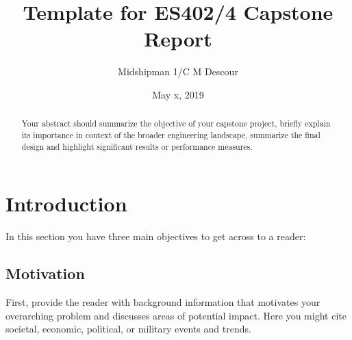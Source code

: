 \documentclass{wsecapstone}
\title{Template for ES402/4 Capstone Report}
\author{Midshipman 1/C M Descour}
\date{May x, 2019} %
\begin{document}
\maketitlepage
\cleardoublepage
\tableofcontents

\clearpage
\maketitle
\begin{abstract}
Your abstract should summarize the objective of your capstone project, briefly explain its importance in context of the broader engineering landscape, summarize the final design and highlight significant results or performance measures.
\end{abstract}





\section{Introduction}
In this section you have three main objectives to get across to a reader:  

\subsection{Motivation}
First, provide the reader with background information that motivates your overarching problem and discusses areas of potential impact.  Here you might cite societal, economic, political, or military events and trends.
\end{document}
